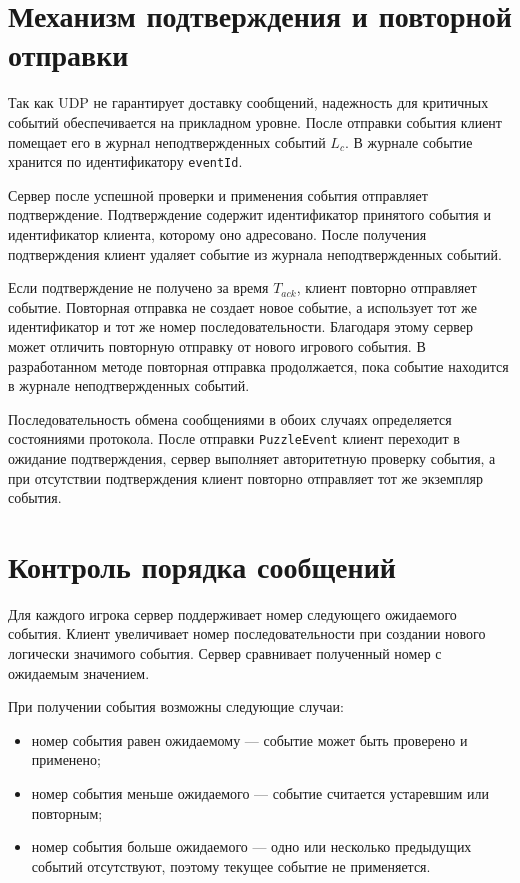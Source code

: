 \section{Механизм подтверждения и повторной отправки}

Так как UDP не гарантирует доставку сообщений, надежность для критичных событий обеспечивается на прикладном уровне. После отправки события клиент помещает его в журнал неподтвержденных событий $L_c$. В журнале событие хранится по идентификатору \texttt{eventId}.

Сервер после успешной проверки и применения события отправляет подтверждение. Подтверждение содержит идентификатор принятого события и идентификатор клиента, которому оно адресовано. После получения подтверждения клиент удаляет событие из журнала неподтвержденных событий.

Если подтверждение не получено за время $T_{ack}$, клиент повторно отправляет событие. Повторная отправка не создает новое событие, а использует тот же идентификатор и тот же номер последовательности. Благодаря этому сервер может отличить повторную отправку от нового игрового события.
В разработанном методе повторная отправка продолжается, пока событие находится в журнале неподтвержденных событий.

Последовательность обмена сообщениями в обоих случаях определяется состояниями протокола. После отправки \texttt{PuzzleEvent} клиент переходит в ожидание подтверждения, сервер выполняет авторитетную проверку события, а при отсутствии подтверждения клиент повторно отправляет тот же экземпляр события.

\section{Контроль порядка сообщений}

Для каждого игрока сервер поддерживает номер следующего ожидаемого события. Клиент увеличивает номер последовательности при создании нового логически значимого события. Сервер сравнивает полученный номер с ожидаемым значением.

При получении события возможны следующие случаи:
\begin{itemize}
	\item номер события равен ожидаемому --- событие может быть проверено и применено;
	\item номер события меньше ожидаемого --- событие считается устаревшим или повторным;
	\item номер события больше ожидаемого --- одно или несколько предыдущих событий отсутствуют, поэтому текущее событие не применяется.
\end{itemize}

